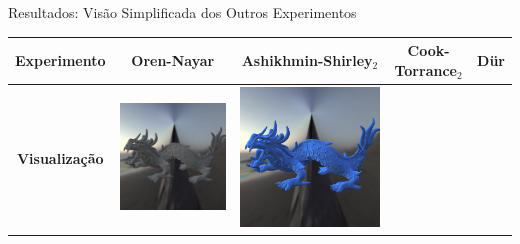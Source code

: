 \begin{frame}[fragile]{Resultados: Visão Simplificada dos Outros Experimentos}
   \begin{table}
       \centering
       \scriptsize %
       \begin{tabular}{|c|c|c|c|c|}
           \hline
           \textbf{Experimento}        & Oren-Nayar     & Ashikhmin-Shirley$_2$   & Cook-Torrance$_2$ & Dür \\ \hline
           \textbf{Visualização} &
           \includegraphics[scale=0.14]{./Imagens/brdfs/oren-nayar-dragon.png} &
           \includegraphics[scale=0.14]{./Imagens/brdfs/ashikhmin-shirley-alternative-dragon.png} &

\end{tabular}
\end{table}
\end{frame}
